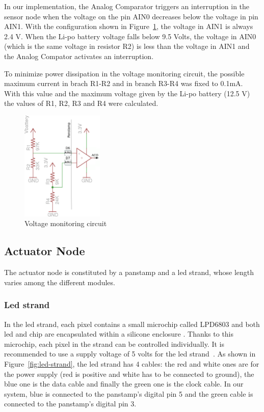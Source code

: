 In our implementation, the Analog Comparator triggers an interruption in the sensor node when the voltage on the pin AIN0 decreases below the voltage in pin AIN1. With the configuration shown in Figure~\ref{fig:voltage-monitor}, the voltage in AIN1 is always 2.4 V. When the Li-po battery voltage falls below 9.5 Volts, the voltage in AIN0 (which is the same voltage in resistor R2) is less than the voltage in AIN1 and the Analog Compator activates an interruption.

To minimize power dissipation in the voltage monitoring circuit, the possible maximum current in brach R1-R2 and in branch R3-R4 was fixed to 0.1mA. With this value and the maximum voltage given by the Li-po battery (12.5 V) the values of R1, R2, R3 and R4 were calculated.  

\begin{figure}[h!] 
 \centering
 \includegraphics[width= 0.35\textwidth, clip=true,keepaspectratio=true]{./graph/voltage_comparator_circuit.png}
 \caption{Voltage monitoring circuit}
 \label{fig:voltage-monitor}
\end{figure}

\subsection{Actuator Node}
The actuator node is constituted by a panstamp and a led strand, whose length varies among the different modules. 
\subsubsection{Led strand}
In the led strand, each pixel contains a small microchip called LPD6803 and both led and chip are encapsulated within a silicone enclosure . Thanks to this microchip, each pixel in the strand can be controlled individually. It is recommended to use a supply voltage of 5 volts for the led strand~\cite{LPD6803}. As shown in Figure~\ref{fig:led-strand}, the led strand has 4 cables: the red and white ones are for the power supply (red is positive and white has to be connected to ground), the blue one is the data cable and finally the green one is the clock cable. In our system, blue is connected to the panstamp's digital pin 5 and the green cable is connected to the panstamp's digital pin 3. 

